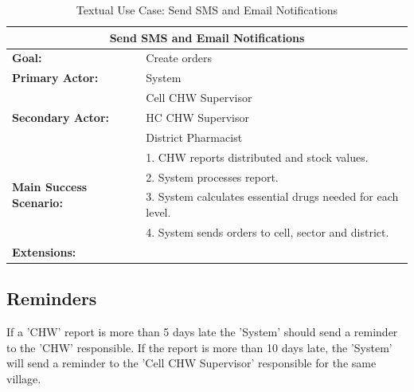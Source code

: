 \documentclass[a4paper]{report}
\begin{document}
\begin{table}[h]
	\centering
	\begin{tabular}{|l|l|}
		\hline
		\multicolumn{2}{|c|}{\textbf{Send SMS and Email Notifications}}\\
		\hline
		\textbf{Goal:} & Create orders\\
		\hline
		\textbf{Primary Actor:} & System\\
		\hline
		\multirow{3}{*}{\textbf{Secondary Actor:}}	& Cell CHW Supervisor \\
																								& HC CHW Supervisor \\ 
																								& District Pharmacist \\
		\hline
		\multirow{4}{*}{\textbf{Main Success Scenario:}}	& 1. CHW reports distributed and stock values. \\
																											& 2. System processes report. \\
																											& 3. System calculates essential drugs needed for each level. \\
																											& 4. System sends orders to cell, sector and district. \\
		\hline
		\textbf{Extensions:} & \\
		\hline
	\end{tabular}
	\caption{Textual Use Case: Send SMS and Email Notifications}
\end{table}
\pagebreak

\subsection{Reminders}

If a 'CHW' report is more than 5 days late the 'System' should send a reminder to the 'CHW' responsible. If the report is more than 10 days late, the 'System' will send a reminder to the 'Cell CHW Supervisor' responsible for the  same village.
\end{document}
